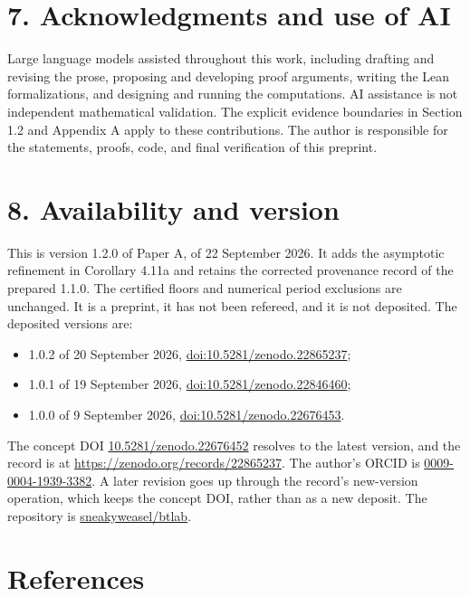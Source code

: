 \documentclass[12pt]{article}
\providecommand{\tightlist}{\setlength{\itemsep}{0pt}\setlength{\parskip}{0pt}}
\begin{document}
\section{7. Acknowledgments and use of
AI}\label{acknowledgments-and-use-of-ai}

Large language models assisted throughout this work, including drafting
and revising the prose, proposing and developing proof arguments,
writing the Lean formalizations, and designing and running the
computations. AI assistance is not independent mathematical validation.
The explicit evidence boundaries in Section 1.2 and Appendix A apply to
these contributions. The author is responsible for the statements,
proofs, code, and final verification of this preprint.

\section{8. Availability and version}\label{availability-and-version}

This is version 1.2.0 of Paper A, of 22 September 2026. It adds the
asymptotic refinement in Corollary 4.11a and retains the corrected
provenance record of the prepared 1.1.0. The certified floors and
numerical period exclusions are unchanged. It is a preprint, it has not
been refereed, and it is not deposited. The deposited versions are:

\begin{itemize}
\tightlist
\item
  1.0.2 of 20 September 2026,
  \href{https://doi.org/10.5281/zenodo.22865237}{doi:10.5281/zenodo.22865237};
\item
  1.0.1 of 19 September 2026,
  \href{https://doi.org/10.5281/zenodo.22846460}{doi:10.5281/zenodo.22846460};
\item
  1.0.0 of 9 September 2026,
  \href{https://doi.org/10.5281/zenodo.22676453}{doi:10.5281/zenodo.22676453}.
\end{itemize}

The concept DOI
\href{https://doi.org/10.5281/zenodo.22676452}{10.5281/zenodo.22676452}
resolves to the latest version, and the record is at
\url{https://zenodo.org/records/22865237}. The author's ORCID is
\href{https://orcid.org/0009-0004-1939-3382}{0009-0004-1939-3382}. A
later revision goes up through the record's new-version operation, which
keeps the concept DOI, rather than as a new deposit. The repository is
\href{https://github.com/sneakyweasel/btlab}{sneakyweasel/btlab}.

\section{References}\label{references}
\end{document}
